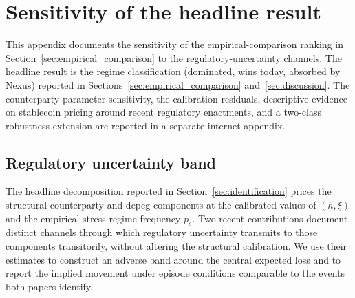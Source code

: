 \section{Sensitivity of the headline result}\label{app:sensitivity}

This appendix documents the sensitivity of the empirical-comparison ranking in Section~\ref{sec:empirical_comparison} to the regulatory-uncertainty channels. The headline result is the regime classification (dominated, wins today, absorbed by Nexus) reported in Sections~\ref{sec:empirical_comparison} and~\ref{sec:discussion}. The counterparty-parameter sensitivity, the calibration residuals, descriptive evidence on stablecoin pricing around recent regulatory enactments, and a two-class robustness extension are reported in a separate internet appendix.

\subsection{Regulatory uncertainty band}\label{sub:regulatory_uncertainty_band}

The headline decomposition reported in Section~\ref{sec:identification} prices the structural counterparty and depeg components at the calibrated values of $(h, \xi)$ and the empirical stress-regime frequency $p_s$. Two recent contributions document distinct channels through which regulatory uncertainty transmits to those components transitorily, without altering the structural calibration. We use their estimates to construct an adverse band around the central expected loss and to report the implied movement under episode conditions comparable to the events both papers identify.

